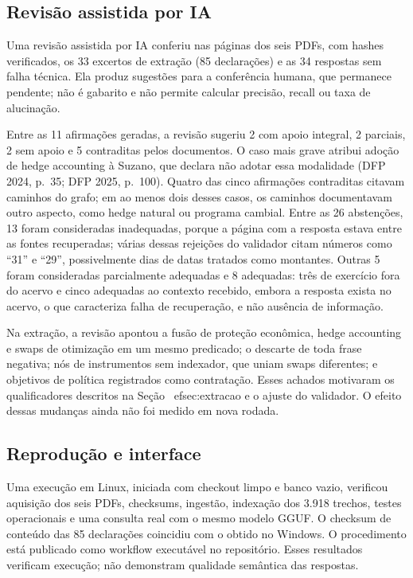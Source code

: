 \documentclass[conference]{IEEEtran}
\begin{document}
\subsection{Revisão assistida por IA}

Uma revisão assistida por IA conferiu nas páginas dos seis PDFs, com hashes verificados, os 33 excertos de extração (85 declarações) e as 34 respostas sem falha técnica. Ela produz sugestões para a conferência humana, que permanece pendente; não é gabarito e não permite calcular precisão, recall ou taxa de alucinação.

Entre as 11 afirmações geradas, a revisão sugeriu 2 com apoio integral, 2 parciais, 2 sem apoio e 5 contraditas pelos documentos. O caso mais grave atribui adoção de hedge accounting à Suzano, que declara não adotar essa modalidade (DFP 2024, p.~35; DFP 2025, p.~100). Quatro das cinco afirmações contraditas citavam caminhos do grafo; em ao menos dois desses casos, os caminhos documentavam outro aspecto, como hedge natural ou programa cambial. Entre as 26 abstenções, 13 foram consideradas inadequadas, porque a página com a resposta estava entre as fontes recuperadas; várias dessas rejeições do validador citam números como ``31'' e ``29'', possivelmente dias de datas tratados como montantes. Outras 5 foram consideradas parcialmente adequadas e 8 adequadas: três de exercício fora do acervo e cinco adequadas ao contexto recebido, embora a resposta exista no acervo, o que caracteriza falha de recuperação, e não ausência de informação.

Na extração, a revisão apontou a fusão de proteção econômica, hedge accounting e swaps de otimização em um mesmo predicado; o descarte de toda frase negativa; nós de instrumentos sem indexador, que uniam swaps diferentes; e objetivos de política registrados como contratação. Esses achados motivaram os qualificadores descritos na Seção~
ef{sec:extracao} e o ajuste do validador. O efeito dessas mudanças ainda não foi medido em nova rodada.

\subsection{Reprodução e interface}

Uma execução em Linux, iniciada com checkout limpo e banco vazio, verificou aquisição dos seis PDFs, checksums, ingestão, indexação dos 3.918 trechos, testes operacionais e uma consulta real com o mesmo modelo GGUF. O checksum de conteúdo das 85 declarações coincidiu com o obtido no Windows. O procedimento está publicado como workflow executável no repositório. Esses resultados verificam execução; não demonstram qualidade semântica das respostas.
\end{document}
